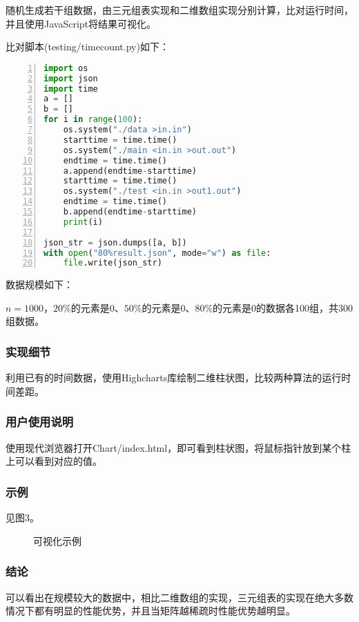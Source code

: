 \documentclass{article}
\begin{document}
随机生成若干组数据，由三元组表实现和二维数组实现分别计算，比对运行时间，并且使用JavaScript将结果可视化。

比对脚本(testing/timecount.py)如下：

\begin{lstlisting}[language={python},
    numbers=left,
    numberstyle=\tiny\consolas,
    basicstyle=\small\consolas]
import os
import json
import time
a = []
b = []
for i in range(100):
    os.system("./data >in.in")
    starttime = time.time()
    os.system("./main <in.in >out.out")
    endtime = time.time()
    a.append(endtime-starttime)
    starttime = time.time()
    os.system("./test <in.in >out1.out")
    endtime = time.time()
    b.append(endtime-starttime)
    print(i)

json_str = json.dumps([a, b])
with open("80%result.json", mode="w") as file:
    file.write(json_str)
\end{lstlisting}

数据规模如下：

$n=1000$，$20\%$的元素是0、$50\%$的元素是0、$80\%$的元素是0的数据各100组，共300组数据。

\subsubsection{实现细节}

利用已有的时间数据，使用Highcharts库绘制二维柱状图，比较两种算法的运行时间差距。

\subsubsection{用户使用说明}

使用现代浏览器打开Chart/index.html，即可看到柱状图，将鼠标指针放到某个柱上可以看到对应的值。

\subsubsection{示例}

见图3。

\begin{figure}[htbp]
    
    
    \caption{可视化示例}
    
\end{figure}

\subsubsection{结论}

可以看出在规模较大的数据中，相比二维数组的实现，三元组表的实现在绝大多数情况下都有明显的性能优势，并且当矩阵越稀疏时性能优势越明显。
\end{document}
